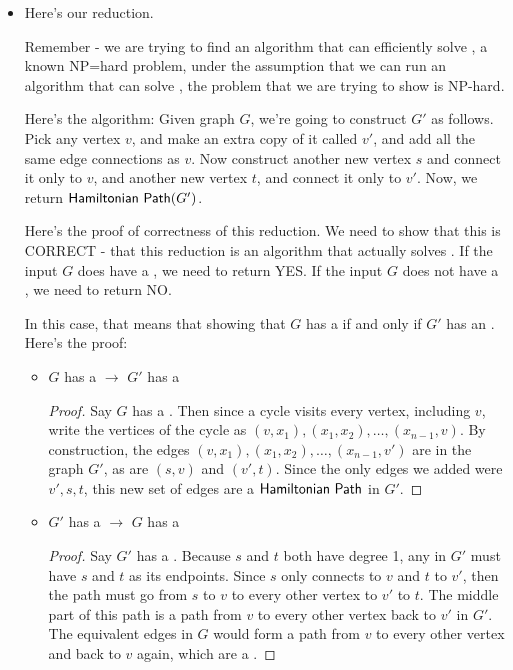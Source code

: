 \begin{questions}
\begin{solution}
\begin{itemize}
      \item 

        Here's our reduction.

        Remember - we are trying to find an algorithm that can efficiently
        solve \HC, a known NP=hard problem, under the assumption that we can
        run an algorithm that can solve \HP, the problem that we are trying to
        show is NP-hard.

        Here's the algorithm:
        Given graph $G$, we're going to construct $G'$ as follows. Pick any
        vertex $v$, and make an extra copy of it called $v'$, and add all the
        same edge connections as $v$.  Now construct another new vertex $s$
        and connect it only to $v$, and another new vertex $t$, and connect it
        only to $v'$. Now, we return $\mathsf{Hamiltonian\ Path}(G')$.

        Here's the proof of correctness of this reduction. We need to show
        that this is CORRECT - that this reduction is an
        algorithm that actually solves \HC. 
        If the input $G$ does have a \HC, we need to return YES. If the input
        $G$ does not have a \HC, we need to return NO.
        
        In this case, that means that showing that $G$ has a \HC if and only
        if $G'$ has an \HP. Here's the proof:

        \begin{itemize}
          \item $G$ has a \HC $\to$ $G'$ has a \HP

            \begin{proof}
              Say $G$ has a \HC. Then since a cycle visits every vertex,
              including $v$, write the vertices of the cycle as $(v, x_1), (x_1,
              x_2), \ldots, (x_{n-1}, v)$. By construction, the edges $(v, x_1),
              (x_1, x_2), \ldots, (x_{n-1}, v')$ are in the graph $G'$, as are
              $(s,v)$ and $(v', t)$. Since the only edges we added were $v', s,
              t$, this new set of edges are a $\mathsf{Hamiltonian\ Path}$ in $G'$.
            \end{proof}

          \item $G'$ has a \HP $\to$ $G$ has a \HC

            \begin{proof}
            Say $G'$ has a \HP.
            Because $s$ and $t$ both have degree 1, any \HP in $G'$ must have
            $s$ and $t$ as its endpoints. Since $s$ only connects to $v$ and
            $t$ to $v'$, then the path must go from $s$ to $v$ to every other
            vertex to $v'$ to $t$. The middle part of this path is a path from
            $v$ to every other vertex back to $v'$ in $G'$. The equivalent
            edges in $G$ would form a path from $v$ to every other vertex and
            back to $v$ again, which are a \HC.
            \end{proof}
        \end{itemize}
    \end{itemize}


\end{solution}
\end{questions}
